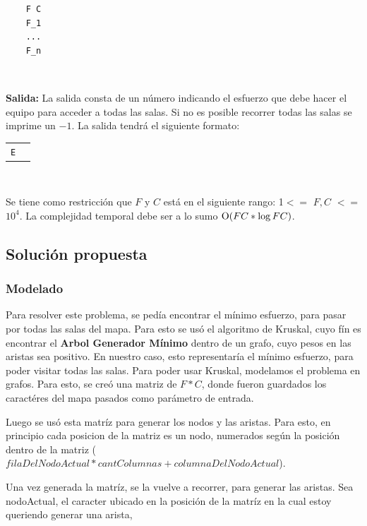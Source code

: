 	\begin{verbatim}
    F C
    F_1
    ...
    F_n
    \end{verbatim}
    

	~

	\textbf{Salida:} La salida consta de un número indicando el esfuerzo que debe hacer el equipo para acceder a todas las salas. Si no es posible recorrer todas las salas se imprime un $−1$. La salida tendrá el siguiente formato:\par
	
	\begin{tabular}{ll}
		\texttt{E}
	\end{tabular}



	~

	Se tiene como restricción que $F$ y $C$ está en el siguiente rango: 1$<=$ $F,C$ $<=$ $10^{4}$. La complejidad temporal debe ser a lo sumo $\operatorname{O}(FC * \log{FC}{})$.

    
    \subsection{Solución propuesta}

    \subsubsection{Modelado}

    Para resolver este problema, se pedía encontrar el mínimo esfuerzo, para pasar por todas las salas del mapa. Para esto se usó el algoritmo de Kruskal, cuyo fín es encontrar el \textbf{Arbol Generador Mínimo} dentro de un grafo, cuyo pesos en las aristas sea positivo. En nuestro caso, esto representaría el mínimo esfuerzo, para poder visitar todas las salas. Para poder usar Kruskal, modelamos el problema en grafos. Para esto, se creó una matriz de $F*C$, donde fueron guardados los caractéres del mapa pasados como parámetro de entrada.\par
    Luego se usó esta matríz para generar los nodos y las aristas. Para esto, en principio cada posicion de la matriz es un nodo, numerados según la posición dentro de la matriz ($filaDelNodoActual * cantColumnas + columnaDelNodoActual$). \par
    Una vez generada la matríz, se la vuelve a recorrer, para generar las aristas. Sea nodoActual, el caracter ubicado en la posición de la matríz en la cual estoy queriendo generar una arista,

